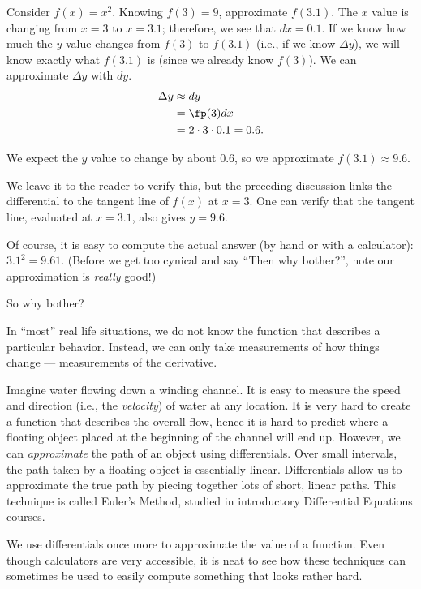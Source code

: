 \begin{example}\label{ex_diffal1}
Consider $f(x) = x^2$. Knowing $f(3) = 9$, approximate $f(3.1)$.
\solution
The $x$ value is changing from $x=3$ to $x=3.1$; therefore, we see that $dx=0.1$. If we know how much the $y$ value changes from $f(3)$ to $f(3.1)$ (i.e., if we know $\Delta y$), we will know exactly what $f(3.1)$ is (since we already know $f(3)$). We can approximate $\Delta y$ with $dy$.
\begin{align*}
	\Delta y &\approx dy \\
	&= \fp(3)dx \\
	&= 2\cdot 3\cdot 0.1 = 0.6.
\end{align*}

We expect the $y$ value to change by about $0.6$, so we approximate $f(3.1) \approx 9.6.$

We leave it to the reader to verify this, but the preceding discussion links the differential to the tangent line of $f(x)$ at $x=3$. One can verify that the tangent line, evaluated at $x=3.1$, also gives $y=9.6$.
\end{example}

Of course, it is easy to compute the actual answer (by hand or with a calculator): $3.1^2 = 9.61.$ (Before we get too cynical and say ``Then why bother?'', note our approximation is \emph{really} good!)

So why bother?

In ``most'' real life situations, we do not know the function that describes a particular behavior. Instead, we can only take measurements of how things change --- measurements of the derivative.

Imagine water flowing down a winding channel. It is easy to measure the speed and direction (i.e., the \emph{velocity}) of water at any location. It is very hard to create a function that describes the overall flow, hence it is hard to predict where a floating object placed at the beginning of the channel will end up. However, we can \emph{approximate} the path of an object using differentials. Over small intervals, the path taken by a floating object is essentially linear. Differentials allow us to approximate the true path by piecing together lots of short, linear paths. This technique is called Euler's Method, studied in introductory Differential Equations courses.

We use differentials once more to approximate the value of a function. Even though calculators are very accessible, it is neat to see how these techniques can sometimes be used to easily compute something that looks rather hard.

